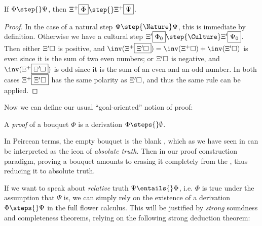 \begin{lemma}
  If $\Phi \step{} \Psi$, then $\Xi^+\select{\Phi} \step{} \Xi^+\select{\Psi}$.
\end{lemma}
\begin{proof}
  In the case of a natural step $\Phi \step{\Nature} \Psi$, this is immediate
  by definition. Otherwise we have a cultural step $\Xi'\select{\Phi_0}
  \step{\Culture} \Xi'\select{\Psi_0}$. Then either $\Xi'\square$ is positive,
  and $\inv(\Xi^+\select{\Xi'\hole}) = \inv(\Xi^+\hole) + \inv(\Xi'\hole)$ is
  even since it is the sum of two even numbers; or $\Xi'\square$ is negative, and
  $\inv(\Xi^+\select{\Xi'\hole})$ is odd since it is the sum of an even and an
  odd number. In both cases $\Xi^+\fbox{$\Xi'\square$}$ has the same polarity as
  $\Xi'\square$, and thus the same rule can be applied.
\end{proof}

Now we can define our usual ``goal-oriented'' notion of proof:

\begin{definition}[Proof]
  A \emph{proof} of a bouquet $\Phi$ is a derivation $\Phi \steps{} \emptyset$.
\end{definition}

In Peircean terms, the empty bouquet is the blank , which as
we have seen in  can be interpreted as the icon of \emph{absolute
truth}. Then in our proof construction paradigm, proving a bouquet amounts to
erasing it completely from the , thus reducing it to absolute
truth.

If we want to speak about \emph{relative} truth $\Psi \entails{} \Phi$, i.e. $\Phi$
is true under the assumption that $\Psi$ is, we can simply rely on the existence
of a derivation $\Phi \steps{} \Psi$ in the full flower calculus. This will be
justified by \emph{strong} soundness and completeness theorems, relying on the
following strong deduction theorem:

